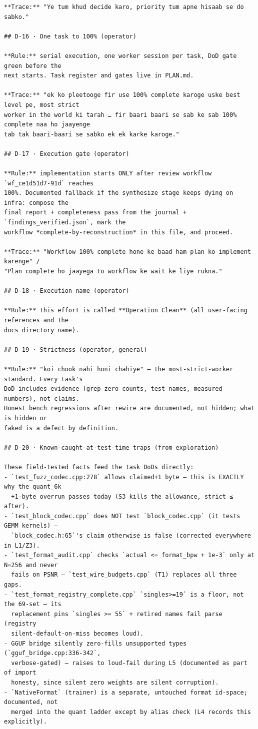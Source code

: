 \begin{verbatim}
**Trace:** "Ye tum khud decide karo, priority tum apne hisaab se do sabko."

## D-16 · One task to 100% (operator)

**Rule:** serial execution, one worker session per task, DoD gate green before the
next starts. Task register and gates live in PLAN.md.

**Trace:** "ek ko pleetooge fir use 100% complete karoge uske best level pe, most strict
worker in the world ki tarah … fir baari baari se sab ke sab 100% complete naa ho jaayenge
tab tak baari-baari se sabko ek ek karke karoge."

## D-17 · Execution gate (operator)

**Rule:** implementation starts ONLY after review workflow `wf_ce1d51d7-91d` reaches
100%. Documented fallback if the synthesize stage keeps dying on infra: compose the
final report + completeness pass from the journal + `findings_verified.json`, mark the
workflow *complete-by-reconstruction* in this file, and proceed.

**Trace:** "Workflow 100% complete hone ke baad ham plan ko implement karenge" /
"Plan complete ho jaayega to workflow ke wait ke liye rukna."

## D-18 · Execution name (operator)

**Rule:** this effort is called **Operation Clean** (all user-facing references and the
docs directory name).

## D-19 · Strictness (operator, general)

**Rule:** "koi chook nahi honi chahiye" — the most-strict-worker standard. Every task's
DoD includes evidence (grep-zero counts, test names, measured numbers), not claims.
Honest bench regressions after rewire are documented, not hidden; what is hidden or
faked is a defect by definition.

## D-20 · Known-caught-at-test-time traps (from exploration)

These field-tested facts feed the task DoDs directly:
- `test_fuzz_codec.cpp:278` allows claimed+1 byte — this is EXACTLY why the quant_6k
  +1-byte overrun passes today (S3 kills the allowance, strict ≤ after).
- `test_block_codec.cpp` does NOT test `block_codec.cpp` (it tests GEMM kernels) —
  `block_codec.h:65`'s claim otherwise is false (corrected everywhere in L1/Z3).
- `test_format_audit.cpp` checks `actual <= format_bpw + 1e-3` only at N=256 and never
  fails on PSNR — `test_wire_budgets.cpp` (T1) replaces all three gaps.
- `test_format_registry_complete.cpp` `singles>=19` is a floor, not the 69-set — its
  replacement pins `singles >= 55` + retired names fail parse (registry
  silent-default-on-miss becomes loud).
- GGUF bridge silently zero-fills unsupported types (`gguf_bridge.cpp:336-342`,
  verbose-gated) — raises to loud-fail during L5 (documented as part of import
  honesty, since silent zero weights are silent corruption).
- `NativeFormat` (trainer) is a separate, untouched format id-space; documented, not
  merged into the quant ladder except by alias check (L4 records this explicitly).


\end{verbatim}
